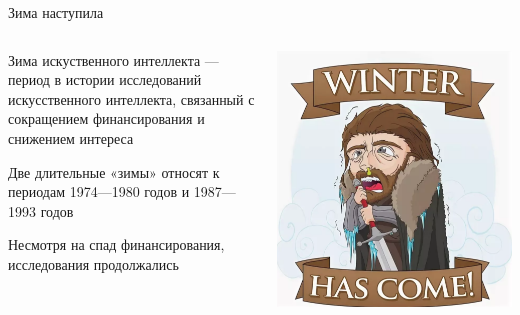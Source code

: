 \documentclass[notes,12pt, aspectratio=169]{beamer}
\newenvironment{wideitemize}{\itemize\addtolength{\itemsep}{10pt}}{\enditemize}
\begin{document}
\begin{frame}{Зима наступила}
\begin{columns}[T]%
	\begin{column}{.7\textwidth}%
		\begin{wideitemize} 
			\item \alert{Зима искуственного интеллекта} — период в истории исследований искусственного интеллекта, связанный с сокращением финансирования и  снижением интереса
			
			\item  Две длительные «зимы» относят к периодам 1974—1980 годов и 1987—1993 годов
			
			\item Несмотря на спад финансирования, исследования продолжались		
		\end{wideitemize} 
	\end{column}%
	\hfill%
	\begin{column}{.3\textwidth}%
		\begin{center}
			\includegraphics[width=.99\linewidth]{stark_2.png}
		\end{center}
	\end{column}%
\end{columns}%
\end{frame}
\end{document}
